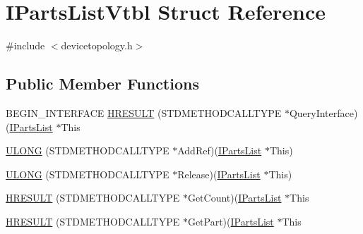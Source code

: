 \hypertarget{struct_i_parts_list_vtbl}{}\section{I\+Parts\+List\+Vtbl Struct Reference}
\label{struct_i_parts_list_vtbl}


{\ttfamily \#include $<$devicetopology.\+h$>$}

\subsection*{Public Member Functions}
\begin{DoxyCompactItemize}
\item 
B\+E\+G\+I\+N\+\_\+\+I\+N\+T\+E\+R\+F\+A\+CE \hyperlink{struct_i_parts_list_vtbl_a74a11d42456eac91a979bb17e241d228}{H\+R\+E\+S\+U\+LT} (S\+T\+D\+M\+E\+T\+H\+O\+D\+C\+A\+L\+L\+T\+Y\+PE $\ast$Query\+Interface)(\hyperlink{devicetopology_8h_a8e228d62a050f73b40337e38a9d1fc04}{I\+Parts\+List} $\ast$This
\item 
\hyperlink{struct_i_parts_list_vtbl_a57f90f8147186b5c01f09c0338d15bc5}{U\+L\+O\+NG} (S\+T\+D\+M\+E\+T\+H\+O\+D\+C\+A\+L\+L\+T\+Y\+PE $\ast$Add\+Ref)(\hyperlink{devicetopology_8h_a8e228d62a050f73b40337e38a9d1fc04}{I\+Parts\+List} $\ast$This)
\item 
\hyperlink{struct_i_parts_list_vtbl_acab800322ee52defaa311e46425997ab}{U\+L\+O\+NG} (S\+T\+D\+M\+E\+T\+H\+O\+D\+C\+A\+L\+L\+T\+Y\+PE $\ast$Release)(\hyperlink{devicetopology_8h_a8e228d62a050f73b40337e38a9d1fc04}{I\+Parts\+List} $\ast$This)
\item 
\hyperlink{struct_i_parts_list_vtbl_a26ee1342e1ef253db9892d485d450c82}{H\+R\+E\+S\+U\+LT} (S\+T\+D\+M\+E\+T\+H\+O\+D\+C\+A\+L\+L\+T\+Y\+PE $\ast$Get\+Count)(\hyperlink{devicetopology_8h_a8e228d62a050f73b40337e38a9d1fc04}{I\+Parts\+List} $\ast$This
\item 
\hyperlink{struct_i_parts_list_vtbl_a7465bad89d89a1c26cff7efae491bfad}{H\+R\+E\+S\+U\+LT} (S\+T\+D\+M\+E\+T\+H\+O\+D\+C\+A\+L\+L\+T\+Y\+PE $\ast$Get\+Part)(\hyperlink{devicetopology_8h_a8e228d62a050f73b40337e38a9d1fc04}{I\+Parts\+List} $\ast$This
\end{DoxyCompactItemize}
